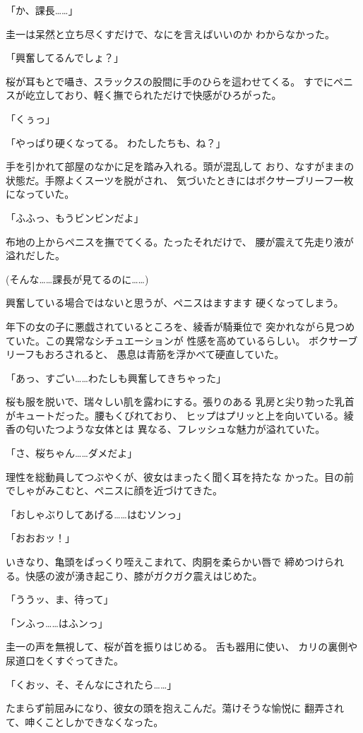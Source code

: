 ﻿\documentclass[
    book,tate,
    line_length=30zw,
    jafontsize=12pt,
    paper=b5j,
    landscape,
    ]{jlreq}
\begin{document}
「か、課長……」

圭一は呆然と立ち尽くすだけで、なにを言えばいいのか
わからなかった。

「興奮してるんでしょ？」

桜が耳もとで囁き、スラックスの股間に手のひらを這わせてくる。
すでにペニスが屹立しており、軽く撫でられただけで快感がひろがった。

「くぅっ」

「やっぱり硬くなってる。 わたしたちも、ね？」

手を引かれて部屋のなかに足を踏み入れる。頭が混乱して
おり、なすがままの状態だ。手際よくスーツを脱がされ、
気づいたときにはボクサーブリーフ一枚になっていた。

「ふふっ、もうビンビンだよ」

布地の上からペニスを撫でてくる。たったそれだけで、
腰が震えて先走り液が溢れだした。

(そんな……課長が見てるのに……)

興奮している場合ではないと思うが、ペニスはますます
硬くなってしまう。

年下の女の子に悪戯されているところを、綾香が騎乗位で
突かれながら見つめていた。この異常なシチュエーションが
性感を高めているらしい。 ボクサーブリーフもおろされると、
愚息は青筋を浮かべて硬直していた。

「あっ、すごい……わたしも興奮してきちゃった」

桜も服を脱いで、瑞々しい肌を露わにする。張りのある
乳房と尖り勃った乳首がキュートだった。腰もくびれており、
ヒップはプリッと上を向いている。綾香の匂いたつような女体とは
異なる、フレッシュな魅力が溢れていた。

「さ、桜ちゃん……ダメだよ」

理性を総動員してつぶやくが、彼女はまったく聞く耳を持たな
かった。目の前でしゃがみこむと、ペニスに顔を近づけてきた。

「おしゃぶりしてあげる……はむソンっ」

「おおおッ！」

いきなり、亀頭をぱっくり咥えこまれて、肉胴を柔らかい唇で
締めつけられる。快感の波が湧き起こり、膝がガクガク震えはじめた。

「ううッ、ま、待って」

「ンふっ……はふンっ」

圭一の声を無視して、桜が首を振りはじめる。 舌も器用に使い、
カリの裏側や尿道口をくすぐってきた。

「くおッ、そ、そんなにされたら……」

たまらず前屈みになり、彼女の頭を抱えこんだ。蕩けそうな愉悦に
翻弄されて、呻くことしかできなくなった。
\end{document}
